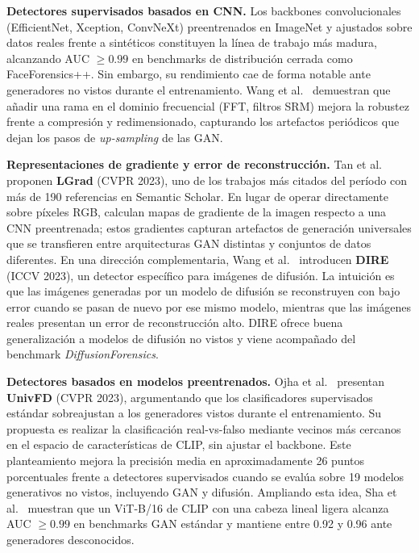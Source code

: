 \documentclass[12pt,a4paper,twoside]{article}
\begin{document}
\textbf{Detectores supervisados basados en CNN.} Los backbones convolucionales
(EfficientNet, Xception, ConvNeXt) preentrenados en ImageNet y ajustados sobre
datos reales frente a sintéticos constituyen la línea de trabajo más madura,
alcanzando AUC $\geq 0.99$ en benchmarks de distribución cerrada como
FaceForensics++. Sin embargo, su rendimiento cae de forma notable ante generadores
no vistos durante el entrenamiento. Wang et al.~\cite{wang2022dual} demuestran que
añadir una rama en el dominio frecuencial (FFT, filtros SRM) mejora la robustez
frente a compresión y redimensionado, capturando los artefactos periódicos que
dejan los pasos de \textit{up-sampling} de las GAN.

\textbf{Representaciones de gradiente y error de reconstrucción.} Tan et
al.~\cite{tan2023lgrad} proponen \textbf{LGrad} (CVPR 2023), uno de los trabajos
más citados del período con más de 190 referencias en Semantic Scholar. En lugar de
operar directamente sobre píxeles RGB, calculan mapas de gradiente de la imagen
respecto a una CNN preentrenada; estos gradientes capturan artefactos de generación
universales que se transfieren entre arquitecturas GAN distintas y conjuntos de
datos diferentes. En una dirección complementaria, Wang et al.~\cite{wang2023dire}
introducen \textbf{DIRE} (ICCV 2023), un detector específico para imágenes de
difusión. La intuición es que las imágenes generadas por un modelo de difusión se
reconstruyen con bajo error cuando se pasan de nuevo por ese mismo modelo, mientras
que las imágenes reales presentan un error de reconstrucción alto. DIRE ofrece buena
generalización a modelos de difusión no vistos y viene acompañado del benchmark
\textit{DiffusionForensics}.

\textbf{Detectores basados en modelos preentrenados.} Ojha et al.~\cite{ojha2023univfd}
presentan \textbf{UnivFD} (CVPR 2023), argumentando que los clasificadores
supervisados estándar sobreajustan a los generadores vistos durante el
entrenamiento. Su propuesta es realizar la clasificación real-vs-falso mediante
vecinos más cercanos en el espacio de características de CLIP, sin ajustar el
backbone. Este planteamiento mejora la precisión media en aproximadamente 26 puntos
porcentuales frente a detectores supervisados cuando se evalúa sobre 19 modelos
generativos no vistos, incluyendo GAN y difusión. Ampliando esta idea, Sha et
al.~\cite{sha2023raising} muestran que un ViT-B/16 de CLIP con una cabeza lineal
ligera alcanza AUC $\geq 0.99$ en benchmarks GAN estándar y mantiene entre 0.92 y
0.96 ante generadores desconocidos.
\end{document}
